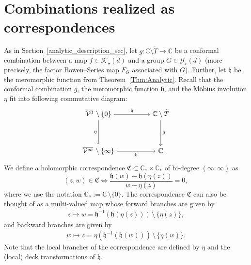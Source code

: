\documentclass[11pt,a4paper, oneside]{amsart}
\theoremstyle{definition}
\theoremstyle{remark}
\numberwithin{equation}{section}
\newcommand{\Kstar}{{\mathscr K_\star}}
\newcommand{\Gstar}{\mathscr G_\star}
\newcommand{\C}{\mathbb{C}}
\newcommand{\sm}{\setminus}
\renewcommand{\tilde}{\widetilde}
\begin{document}
\section{Combinations realized as correspondences}\label{corr_sec}

As in Section~\ref{analytic_description_sec}, let $g \colon\C\setminus\widetilde{T}\to\C$ be a conformal combination between a map $f\in\Kstar(d)$ and a group $G\in\Gstar(d)$ (more precisely, the factor Bowen--Series map $F_G$ associated with $G$). 
Further, let $\mathfrak{h}$ be the meromorphic function from Theorem~\ref{Thm:Analytic}.
Recall that the conformal combination $g$, the meromorphic function $\mathfrak{h}$, and the M{\"o}bius involution $\eta$ fit into following commutative diagram:
\begin{equation}
\begin{tikzcd}
	{\overline{\mathcal{V}^0}\,\sm\{0\}} && {\C \sm \tilde T} \\
	\\
	{\overline{\mathcal{V}^\infty}\,\sm\{\infty\}} && {\mathbb{C}}
	\arrow["{\mathfrak{h}}", from=1-1, to=1-3]
	\arrow["\eta",swap, from=1-1, to=3-1]
	\arrow["{\mathfrak{h}}"', from=3-1, to=3-3]
	\arrow["g"',swap, from=1-3, to=3-3]
\end{tikzcd}
\label{anal_char_cd}
\end{equation}
We define a holomorphic correspondence $\mathfrak{C}\subset \C_* \times \C_*$ of bi-degree $(\infty:\infty)$ as
\begin{equation}
(z, w) \in \mathfrak{C} \iff \frac{\mathfrak{h}(w)-\mathfrak{h}(\eta(z))}{w- \eta(z)}=0,
\label{corr_eq}
\end{equation}
where we use the notation $\C_*:=\C\,\setminus\{0\}$. 
The correspondence $\mathfrak{C}$ can also be thought of as a multi-valued map whose forward branches are given by
\begin{align}
z\mapsto w=\mathfrak{h}^{-1}(\mathfrak{h}(\eta(z)))\,\setminus\,\{\eta(z)\},
\label{forward_corr_eqn}
\end{align}
and backward branches are given by
\begin{align}
w\mapsto z=\eta(\mathfrak{h}^{-1}(\mathfrak{h}(w)))\,\setminus\,\{\eta(w)\}. 
\label{backward_corr_eqn}
\end{align}
Note that the local branches of the correspondence are defined by $\eta$ and the (local) deck transformations of $\mathfrak{h}$.
\end{document}
